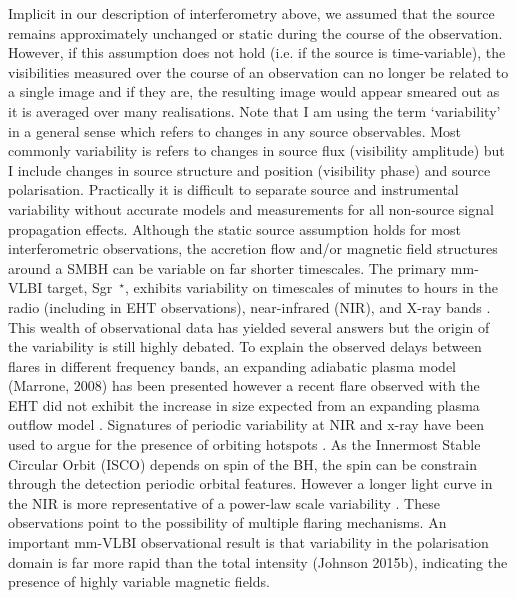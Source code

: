 Implicit in our description of interferometry above, we assumed that the source remains approximately unchanged or static during the course of the observation. However, if this assumption does not hold (i.e. if the source is time-variable),  the visibilities measured over the course of an observation can no longer be related to a single image and if they are, the resulting image would appear smeared out as it is averaged over many realisations. 
Note that I am using the term `variability' in a general sense which refers to changes in any source observables. Most commonly variability is refers to changes in source flux (visibility amplitude) but I include changes in source structure and position (visibility phase) and source polarisation. Practically it is difficult to separate source and instrumental variability without accurate models and measurements for all non-source signal propagation effects. 
Although the static source assumption holds for most interferometric observations, the accretion flow and/or magnetic field structures around a SMBH can be variable on far shorter timescales. The primary mm-VLBI target, Sgr~$^\star$,  exhibits variability on timescales of minutes to hours in the radio (including in EHT observations), near-infrared (NIR), and X-ray bands \citep[e.g.][]{Baganoff_2001, Genzel_2003, Yusef-Zadeh_2006, Maronne_2006, Fish_2011, Johnson_2015b}. This wealth of observational data has yielded several answers but the origin of the variability is still highly debated. To explain the observed delays between flares in different frequency bands, an expanding adiabatic plasma model (Marrone, 2008) has been presented however a recent flare observed with the EHT did not exhibit the increase in size expected from an expanding plasma outflow model \cite{Fish_2011}.  Signatures of periodic variability at NIR and x-ray \citep{Genzel_2003; Belanger_2006} have been used to argue for the presence of orbiting hotspots \cite{Doeleman_2009}. As the Innermost Stable Circular Orbit (ISCO) depends on spin of the BH, the spin can be constrain through the detection periodic orbital features. However a longer light curve in the NIR is more representative of a power-law scale variability \cite{Meyer_2008}. These observations point to the possibility of multiple flaring mechanisms. An important mm-VLBI observational result is that variability in the polarisation domain is far more rapid than the total intensity (Johnson 2015b), indicating the presence of highly variable magnetic fields.
